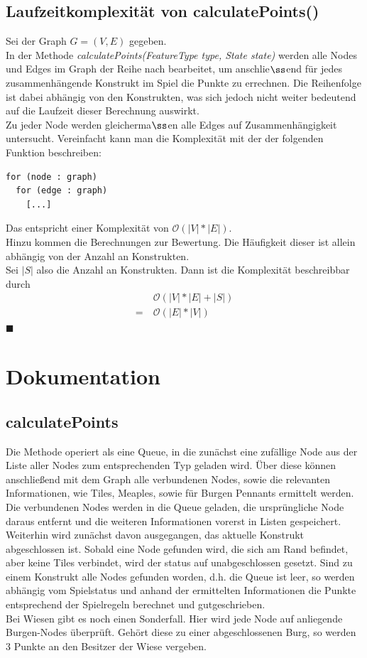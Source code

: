 \documentclass{article}
\newcommand*{\qed}{\hfill\ensuremath{\blacksquare}\\}%
\begin{document}
\subsection{Laufzeitkomplexit\"at von calculatePoints()}
Sei der Graph $G = (V,E)$ gegeben.\\
In der Methode \textit{calculatePoints(FeatureType type, State state)} werden alle Nodes und Edges im Graph der Reihe nach bearbeitet, um anschlie$\ss$end f\"ur jedes zusammenh\"angende Konstrukt im Spiel die Punkte zu errechnen. Die Reihenfolge ist dabei abh\"angig von den Konstrukten, was sich jedoch nicht weiter bedeutend auf die Laufzeit dieser Berechnung auswirkt.\\
Zu jeder Node werden gleicherma$\ss$en alle Edges auf Zusammenh\"angigkeit untersucht. Vereinfacht kann man die Komplexit\"at mit der der folgenden Funktion beschreiben:
\begin{lstlisting}
for (node : graph)
  for (edge : graph)
    [...]
\end{lstlisting}
Das entspricht einer Komplexit\"at von $\mathcal{O}(|V|*|E|)$.\\
Hinzu kommen die Berechnungen zur Bewertung. Die H\"aufigkeit dieser ist allein abh\"angig von der Anzahl an Konstrukten.\\
Sei $|S|$ also die Anzahl an Konstrukten. Dann ist die Komplexit\"at beschreibbar durch
\begin{align*}
&\mathcal{O}(|V|*|E|+|S|)\\
= \ &\mathcal{O}(|E|*|V|)
\end{align*}
\qed

\section{Dokumentation}
\subsection{calculatePoints}
Die Methode operiert als eine Queue, in die zunächst eine zufällige Node aus der Liste aller Nodes zum entsprechenden Typ geladen wird. Über diese können anschließend mit dem Graph alle verbundenen Nodes, sowie die relevanten Informationen, wie Tiles, Meaples, sowie für Burgen Pennants ermittelt werden. Die verbundenen Nodes werden in die Queue geladen, die ursprüngliche Node daraus entfernt und die weiteren Informationen vorerst in Listen gespeichert. Weiterhin wird zunächst davon ausgegangen, das aktuelle Konstrukt abgeschlossen ist. Sobald eine Node gefunden wird, die sich am Rand befindet, aber keine Tiles verbindet, wird der status auf unabgeschlossen gesetzt. Sind zu einem Konstrukt alle Nodes gefunden worden, d.h. die Queue ist leer, so werden abhängig vom Spielstatus und anhand der ermittelten Informationen die Punkte entsprechend der Spielregeln berechnet und gutgeschrieben.\\
Bei Wiesen gibt es noch einen Sonderfall. Hier wird jede Node auf anliegende Burgen-Nodes überprüft. Gehört diese zu einer abgeschlossenen Burg, so werden 3 Punkte an den Besitzer der Wiese vergeben.
\end{document}
